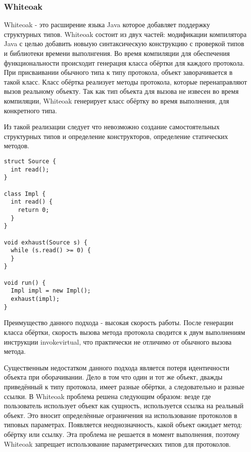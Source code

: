 \subsubsection{Whiteoak}
Whiteoak - это расширение языка Java которое добавляет поддержку структурных типов\cite{whiteoak}. Whiteoak состоит из двух частей: модификации компилятора Java с целью добавить новыую синтаксическую конструкцию с проверкой типов и библиотеки времени выполнгения. Во время компиляции для обеспечения функциональности происходит генерация класса обёртки для каждого протокола. При присваивании обычного типа к типу протокола, объект заворачивается в такой класс. Класс обёртка реализует методы протокола, которые перенаправляют вызов реальному объекту. Так как тип объекта для вызова не извесен во время компиляции, Whiteoak генерирует класс обёртку во время выполнения, для конкретного типа.

Из такой реализации следует что невозможно создание самостоятельных структурных типов и определение конструкторов, определение статических методов.

\begin{verbatim}
struct Source { 
  int read();
}

class Impl {
  int read() {
    return 0;
  }
}

void exhaust(Source s) {
  while (s.read() >= 0) {
  }
}

void run() {
  Impl impl = new Impl();
  exhaust(impl);
}

\end{verbatim}

Преимущество данного подхода - высокая скорость работы. После генерации класса обёртки, скорость вызова метода протокола сводится к двум выполнениям инструкции invokevirtual, что практически не отличимо от обычного вызова метода.

Существенным недостатком данного подхода является потеря идентичности объекта при оборачивании. Дело в том что один и тот же объект, дважды приведённый к типу протокола, имеет разные обёртки, а следовательно и разные ссылки. В Whiteoak проблема решена следующим образом: везде где пользователь использует объект как сущность, используется ссылка на реальный объект. Это вносит определённые ограничения на использование протоколов в типовых параметрах. Появляется неоднозначность, какой объект ожидает метод: обёртку или ссылку. Эта проблема не решается в момент выполнения, поэтому Whiteoak запрещает использование параметрических типов для протоколов.
